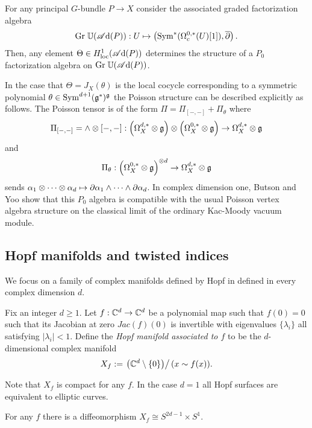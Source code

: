 \documentclass[10pt]{amsart}
\def\sAd{\sA{\rm d}}
\begin{document}
\begin{cor} For any principal $G$-bundle $P \to X$ consider the associated graded factorization algebra
\[
{\rm Gr} \; \UU (\sAd(P)) : U \mapsto \left(\Sym^*(\Omega^{0,*}_c(U) [1]), \dbar \right) .
\]
Then, any element $\Theta \in H^1_{\rm loc}(\sAd(P))$ determines the structure of a $P_0$ factorization algebra on ${\rm Gr} \; \UU (\sAd(P))$. 
\end{cor}

In the case that $\Theta = J_X (\theta)$ is the local cocycle corresponding to a symmetric polynomial $\theta \in {\rm Sym}^{d+1}(\mathfrak g^*)^\mathfrak g$ the Poisson structure can be described explicitly as follows. 
The Poisson tensor is of the form $\Pi = \Pi_{[-,-]} + \Pi_\theta $ where 
\[
\Pi_{[-,-]} = \wedge \otimes [-,-] : \left(\Omega^{d,*}_X \otimes \mathfrak g \right) \otimes \left(\Omega^{0,*}_X \otimes \mathfrak g\right) \to \Omega^{d,*}_X \otimes \mathfrak g 
\] 
and
\[
\Pi_{\theta} : \left(\Omega^{0,*}_X \otimes \mathfrak g\right)^{\otimes d} \to \Omega^{d,*}_X\otimes \mathfrak g
\]
sends $\alpha_1 \otimes \cdots \otimes \alpha_d \mapsto \partial \alpha_1 \wedge \cdots \wedge \partial \alpha_d$. 
In complex dimension one, Butson and Yoo \cite{BY} show that this $P_0$ algebra is compatible with the usual Poisson vertex algebra structure on the classical limit of the ordinary Kac-Moody vacuum module.

\subsection{Hopf manifolds and twisted indices}

We focus on a family of complex manifolds defined by Hopf in \cite{Hopf} defined in every complex dimension $d$. 

\begin{dfn}
Fix an integer $d \geq 1$.
Let $f : \mathbb C^d \to \mathbb C^d$ be a polynomial map such that $f(0) = 0$ such that its Jacobian at zero $Jac(f)(0)$ is invertible with eigenvalues $\{\lambda_i\}$ all satisfying $|\lambda_i|<1$. 
Define the {\em Hopf manifold associated to $f$} to be the $d$-dimensional complex manifold
\[
X_f := \left. \left(\mathbb C^d \setminus \{0\}\right) \right/ (x \sim f(x)) .
\]
\end{dfn}

Note that $X_{f}$ is compact for any $f$. 
In the case $d=1$ all Hopf surfaces are equivalent to elliptic curves.

\begin{lem} 
For any $f$ there is a diffeomorphism $X_f \cong S^{2d-1} \times S^1$.
\end{lem}
\end{document}
